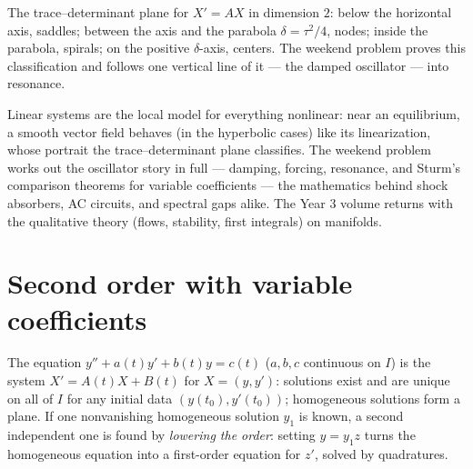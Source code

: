 \begin{omfigure}

{\small The trace--determinant plane for $X' = AX$ in dimension
$2$: below the horizontal axis, saddles; between the axis and
the parabola $\delta = \tau^2/4$, nodes; inside the parabola,
spirals; on the positive $\delta$-axis, centers. The weekend
problem proves this classification and follows one vertical
line of it --- the damped oscillator --- into resonance.}
\end{omfigure}

\begin{remark}
Linear systems are the local model for everything nonlinear:
near an equilibrium, a smooth vector field behaves (in the
hyperbolic cases) like its linearization, whose portrait the
trace--determinant plane classifies. The weekend problem works
out the oscillator story in full --- damping, forcing,
resonance, and Sturm's comparison theorems for variable
coefficients --- the mathematics behind shock absorbers, AC
circuits, and spectral gaps alike. The Year 3 volume returns
with the qualitative theory (flows, stability, first
integrals) on manifolds.
\end{remark}

\section{Second order with variable coefficients}

\begin{proposition}\label{prop:b2:diffeq:secondorder}
The equation $y'' + a(t)y' + b(t)y = c(t)$ ($a, b, c$ continuous on
$I$) is the system $X' = A(t)X + B(t)$ for $X = (y, y')$: solutions
exist and are unique on all of $I$ for any initial data $(y(t_0),
y'(t_0))$; homogeneous solutions form a plane. If one nonvanishing
homogeneous solution $y_1$ is known, a second independent one is
found by \emph{lowering the order}: setting $y = y_1 z$ turns the
homogeneous equation into a first-order equation for $z'$, solved
by quadratures.
\end{proposition}

